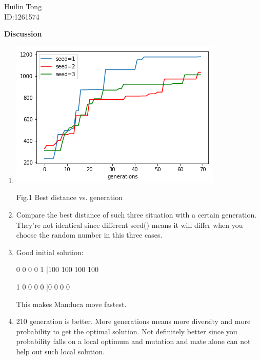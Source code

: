 \documentclass{article}
\begin{document}
\begin{center} Huilin Tong\\
ID:1261574
\end{center}

{\bf Discussion}\\

\begin{enumerate}
\item 
\begin{center}
\includegraphics[scale=0.7]{d1.png}

Fig.1 Best distance vs. generation
\end{center}

\item Compare the best distance of such three situation with a certain generation. They're not identical since different seed() means it will differ when you choose the random number in this three cases.

\item Good initial solution:

0 0 0 0 1 |100 100 100 100

1 0 0 0 0 |0   0   0   0

This makes Manduca move fastest.

\item 210 generation is better. More generations means more diversity and more probability to get the optimal solution. Not definitely better since you probability falls on a local optimum and mutation and mate alone can not help out such local solution.
\end{enumerate}
\end{document}
